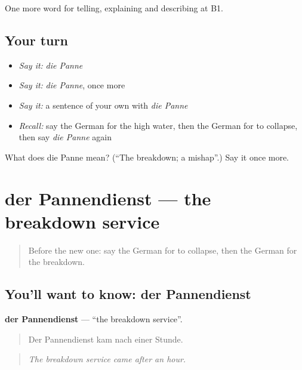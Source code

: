 \begin{grammarlens}[title={What you've built}]
One more word for telling, explaining and describing at B1.
\end{grammarlens}

\subsection*{Your turn}
\begin{itemize}
\raggedright
  \item \emph{Say it:} \emph{die Panne}
  \item \emph{Say it:} \emph{die Panne}, once more
  \item \emph{Say it:} a sentence of your own with \emph{die Panne}
  \item \emph{Recall:} say the German for the high water, then the German for to collapse, then say \emph{die Panne} again
\end{itemize}

\begin{tcolorbox}[breakable,colback=teal!4,colframe=teal!35!black,title={Before you move on}]
What does die Panne mean? (\textquotedblleft{}The breakdown; a mishap\textquotedblright{}.) Say it once more.
\end{tcolorbox}
\section[der Pannendienst]{der Pannendienst — the breakdown service}

\label{lesson:GE-C295-pannendienst}



\begin{quote}
Before the new one: say the German for to collapse, then the German for the breakdown.
\end{quote}

\subsection*{You'll want to know: der Pannendienst}
\textbf{der Pannendienst} — \textquotedblleft{}the breakdown service\textquotedblright{}.

\begin{quote}
Der Pannendienst kam nach einer Stunde.
\end{quote}

\begin{quote}
\emph{The breakdown service came after an hour.}
\end{quote}

